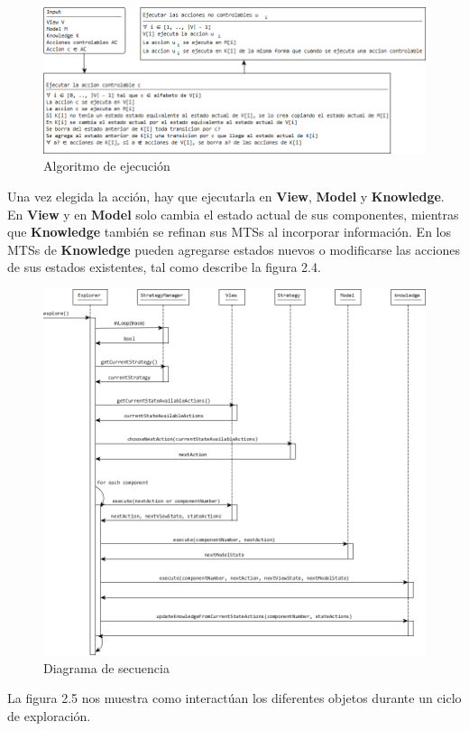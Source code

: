 \begin{figure}[H]
  \centering
    \includegraphics[width=1.0\textwidth]{Imagenes/Algoritmo/Algoritmo_ejecutar.png}
  \caption{Algoritmo de ejecución}
  \label{fig:Algoritmo_ejecutar}
\end{figure}

Una vez elegida la acción, hay que ejecutarla en \textbf{View}, \textbf{Model} y \textbf{Knowledge}. En \textbf{View} y en \textbf{Model} solo cambia el estado
actual de sus componentes, mientras que \textbf{Knowledge} también se refinan sus MTSs al incorporar información. En los MTSs de \textbf{Knowledge} pueden 
agregarse estados nuevos o modificarse las acciones de sus estados existentes, tal como describe la figura 2.4.

\begin{figure}[H]
  \centering
    \includegraphics[width=1.0\textwidth]{Imagenes/Algoritmo/Secuencia_explorar.png}
  \caption{Diagrama de secuencia}
  \label{fig:Secuencia_explorar}
\end{figure}

La figura 2.5 nos muestra como interactúan los diferentes objetos durante un ciclo de exploración.
